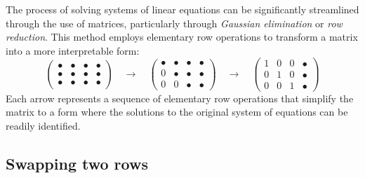 \documentclass{ximera}
\begin{document}
The process of solving systems of linear equations can be
significantly streamlined through the use of matrices, particularly
through \textit{Gaussian elimination} or \textit{row reduction}. This
method employs elementary row operations to transform a matrix into a
more interpretable form:
\[
  \begin{pmatrix}
    \bullet & \bullet & \bullet & \bullet \\
    \bullet & \bullet & \bullet & \bullet \\
    \bullet & \bullet & \bullet & \bullet
  \end{pmatrix}
  \quad \longrightarrow \quad
  \begin{pmatrix}
    \bullet & \bullet & \bullet & \bullet \\
    0 & \bullet & \bullet & \bullet \\
    0 & 0 & \bullet & \bullet
  \end{pmatrix}
  \quad \longrightarrow \quad
  \begin{pmatrix}
    1 & 0 & 0 & \bullet \\
    0 & 1 & 0 & \bullet \\
    0 & 0 & 1 & \bullet
  \end{pmatrix}
\]
Each arrow represents a sequence of elementary row operations that
simplify the matrix to a form where the solutions to the original
system of equations can be readily identified.


\subsection{Swapping two rows}
\end{document}
